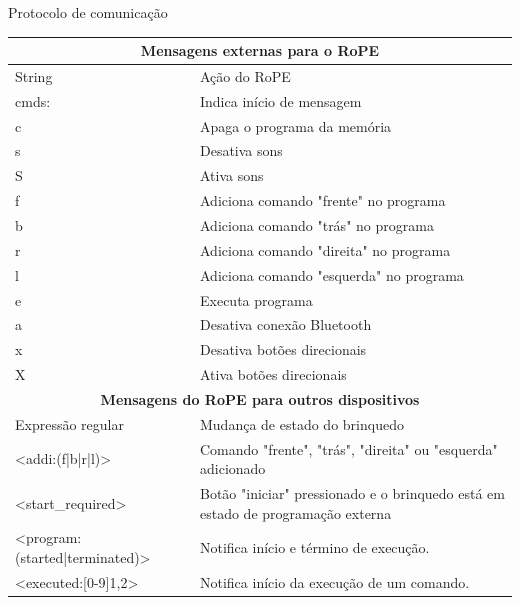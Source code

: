 {\renewcommand{\arraystretch}{1.3}
\begin{quadro}
    \caption{Protocolo de comunicação}
    \label{quadro:protocol}
    \begin{centering}
    \begin{tabular}{|p{}|p{}|}
        \hline
        \multicolumn{2}{|c|}{\textbf{Mensagens externas para o RoPE}} \\ \hline
        String           & Ação do RoPE                                \\ \hline
        cmds:            & Indica início de mensagem \\ \hline
        c                & Apaga o programa da memória \\ \hline
        s                & Desativa sons \\ \hline
        S                & Ativa sons \\ \hline
        f                & Adiciona comando "frente" no programa \\ \hline
        b                & Adiciona comando "trás" no programa \\ \hline
        r                & Adiciona comando "direita" no programa \\ \hline
        l                & Adiciona comando "esquerda" no programa \\ \hline
        e                & Executa programa \\ \hline
        a                & Desativa conexão Bluetooth \\ \hline
        x                & Desativa botões direcionais \\ \hline
        X                & Ativa botões direcionais \\ \hline
        \multicolumn{2}{|c|}{\textbf{Mensagens do RoPE para outros dispositivos}} \\ \hline
        Expressão regular & Mudança de estado do brinquedo \\ \hline
        <addi:(f|b|r|l)>  & Comando "frente", "trás", "direita" ou "esquerda" adicionado \\ \hline
        <start\_required>  & Botão "iniciar" pressionado e o brinquedo está em estado de programação externa \\ \hline
        <program:(started|terminated)>  & Notifica início e término de execução. \\ \hline
        <executed:[0-9]{1,2}>  & Notifica início da execução de um comando. \\ \hline
    \end{tabular}
    \end{centering}
    \sourceauthor
\end{quadro}
}


